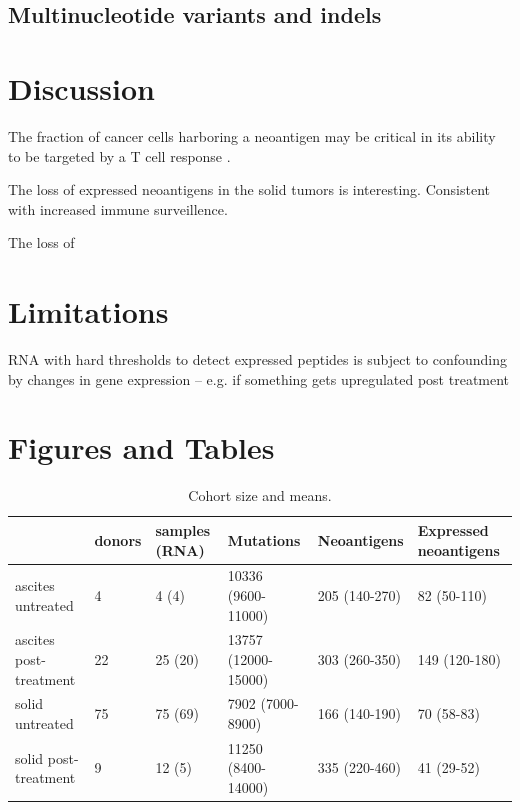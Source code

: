 \subsection*{Multinucleotide variants and indels}


\section*{Discussion}

The fraction of cancer cells harboring a neoantigen may be critical in its ability to be targeted by a T cell response \cite{McGranahan_2016}.

The loss of expressed neoantigens in the solid tumors is interesting. Consistent with increased immune surveillence.

The loss of 

\section*{Limitations}
RNA with hard thresholds to detect expressed peptides is subject to confounding by changes in gene expression -- e.g. if something gets upregulated post treatment

\section*{Figures and Tables}

\begin{table}
\begin{tabular}{llllll}
\toprule
{} & donors & samples (RNA) &            Mutations &    Neoantigens & Expressed neoantigens \\
\midrule
ascites untreated      &      4 &         4 (4) &   10336 (9600-11000) &  205 (140-270) &           82 (50-110) \\
ascites post-treatment &     22 &       25 (20) &  13757 (12000-15000) &  303 (260-350) &         149 (120-180) \\
solid untreated        &     75 &       75 (69) &     7902 (7000-8900) &  166 (140-190) &            70 (58-83) \\
solid post-treatment   &      9 &        12 (5) &   11250 (8400-14000) &  335 (220-460) &            41 (29-52) \\
\bottomrule
\end{tabular}

\caption{Cohort size and means.}
\label{tab:cohort}
\end{table}

